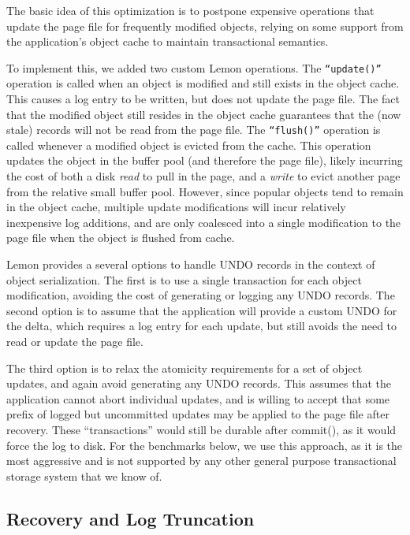 \documentclass[10pt,letterpaper,twocolumn,english]{article}
\newcommand{\yad}{Lemon\xspace}
\begin{document}
The basic idea of this optimization is to postpone expensive
operations that update the page file for frequently modified objects,
relying on some support from the application's object cache
to maintain transactional semantics.

To implement this, we added two custom \yad operations. The
{\tt``update()''} operation is called when an object is modified and
still exists in the object cache. This causes a log entry to be
written, but does not update the page file. The fact that the modified
object still resides in the object cache guarantees that the (now stale)
records will not be read from the page file. The {\tt ``flush()''}
operation is called whenever a modified object is evicted from the
cache. This operation updates the object in the buffer pool (and
therefore the page file), likely incurring the cost of both a disk {\em
read} to pull in the page, and a {\em write} to evict another page
from the relative small buffer pool.  However, since popular 
objects tend to remain in the object cache, multiple update
modifications will incur relatively inexpensive log additions,
and are only coalesced into a single modification to the page file
when the object is flushed from cache.

\yad provides a several options  to handle UNDO records in the context
of object serialization. The first is to use a single transaction for
each object modification, avoiding the cost of generating or logging
any UNDO records. The second option is to assume that the
application will provide a custom UNDO for the delta, 
which requires a log entry for each update, 
but still avoids the need to read or update the page
file.

The third option is to relax the atomicity requirements for a set of
object updates, and again avoid generating any UNDO records. This
assumes that the application cannot abort individual updates, 
and is willing to
accept that some prefix of logged but uncommitted updates may 
be applied to the page
file after recovery. These ``transactions'' would still be durable
after commit(), as it would force the log to disk. 
For the benchmarks below, we
use this approach, as it is the most aggressive and is
not supported by any other general purpose transactional 
storage system that we know of.

\subsection{Recovery and Log Truncation}
\end{document}
